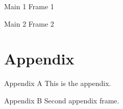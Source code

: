 \documentclass[aspectratio=169]{beamer}
\begin{document}
\begin{frame}{Main 1}
  Frame 1
\end{frame}

\begin{frame}{Main 2}
  Frame 2
\end{frame}

\appendix
\section{Appendix}

\begin{frame}{Appendix A}
  This is the appendix.
\end{frame}

\begin{frame}{Appendix B}
  Second appendix frame.
\end{frame}
\end{document}
